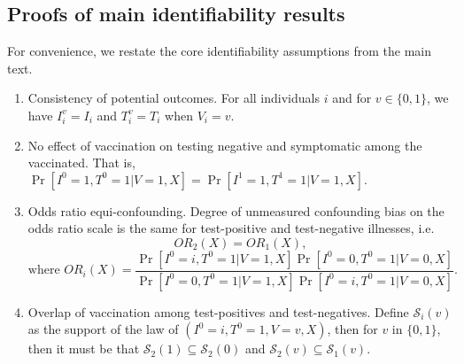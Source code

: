 
\begin{appendix}

    \renewcommand{\thefigure}{A\arabic{figure}}
    \setcounter{figure}{0}
    
    \renewcommand{\thetable}{A\arabic{table}}
    \setcounter{table}{0}
    
    \renewcommand{\theequation}{A\arabic{equation}}
    \setcounter{equation}{0}

    \singlespacing
    \newpage

    \section{Proofs of main identifiability results} \label{sec:proofs}
    For convenience, we restate the core identifiability assumptions from the main text. 
    \begin{enumerate}[label=\upshape(A\arabic*), ref=A\arabic*]
    \item\label{app_ass1} Consistency of potential outcomes. For all individuals $i$ and for $v \in \{0, 1\}$, we have $I_i^v = I_i$ and $T_i^v = T_i$ when $V_i = v$. 
    \item\label{app_ass2} No effect of vaccination on testing negative and symptomatic among the vaccinated. That is, $\Pr[I^0 = 1, T^0=1 | V = 1, X] = \Pr[I^1 = 1, T^1=1 | V = 1, X].$
    \item\label{app_ass3} Odds ratio equi-confounding. Degree of unmeasured confounding bias on the odds ratio scale is the same for test-positive and test-negative illnesses, i.e. 
    $$OR_2(X) = OR_1(X), $$
    $$ \text{where } OR_i(X) = \frac{\Pr[I^0 = i, T^0 = 1 | V = 1, X]\Pr[I^0 = 0, T^0 = 1 | V = 0, X]}{\Pr[I^0 = 0, T^0 = 1 | V = 1, X]\Pr[I^0 = i, T^0 = 1| V = 0, X]}.$$
    \item\label{app_ass4} Overlap of vaccination among test-positives and test-negatives. Define $\mathcal{S}_i(v)$ as the support of the law of $(I^0 = i, T^0 = 1, V = v, X)$, then for $v$ in $\{0,1\}$, then it must be that $\mathcal{S}_2(1) \subseteq \mathcal{S}_2(0)$ and $\mathcal{S}_2(v) \subseteq \mathcal{S}_1(v).$
\end{enumerate}


\end{appendix}
